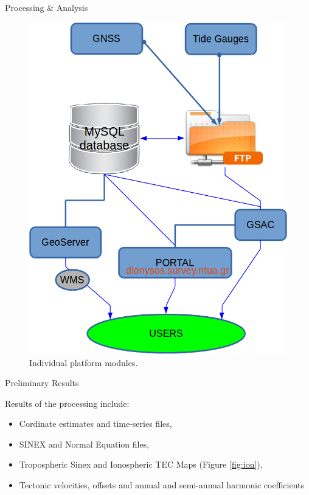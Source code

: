 \documentclass[final,a0,portrait]{beamer}
\newlength{\onecolwid}
\begin{document}
\begin{frame}[t]
\begin{columns}[t]
\begin{column}{\onecolwid}
\begin{block}{Processing \& Analysis}
\begin{figure}
\begin{minipage}{.45\textwidth}
    \includegraphics[width=.8\linewidth]{flowc.png}
    \caption{Individual platform modules.}
    \label{fig:flowc}
\end{minipage}
\end{figure}
\end{block}


\begin{block}{Preliminary Results}
{\small
Results of the processing include:\\
\begin{itemize}
\item Cordinate estimates and time-series files,
\item SINEX and Normal Equation files,
\item Tropospheric Sinex and Ionospheric TEC Maps (Figure \ref{fig:ion}),
\item Tectonic velocities, offsets and annual and semi-annual harmonic coefficients
\end{itemize}

}
\end{block}
\end{column}
\end{columns}
\end{frame}
\end{document}
